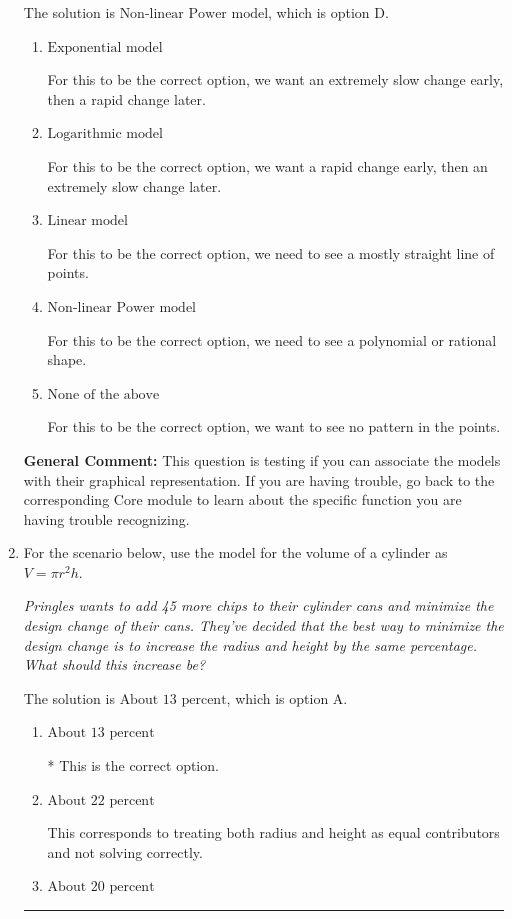\documentclass{extbook}[14pt]
\newcommand{\litem}[1]{\item #1

\rule{\textwidth}{0.4pt}}
\begin{document}
\begin{enumerate}
{The solution is \( \text{Non-linear Power model} \), which is option D.\begin{enumerate}[label=\Alph*.]
\item \( \text{Exponential model} \)

For this to be the correct option, we want an extremely slow change early, then a rapid change later.
\item \( \text{Logarithmic model} \)

For this to be the correct option, we want a rapid change early, then an extremely slow change later.
\item \( \text{Linear model} \)

For this to be the correct option, we need to see a mostly straight line of points.
\item \( \text{Non-linear Power model} \)

For this to be the correct option, we need to see a polynomial or rational shape.
\item \( \text{None of the above} \)

For this to be the correct option, we want to see no pattern in the points.
\end{enumerate}

\textbf{General Comment:} This question is testing if you can associate the models with their graphical representation. If you are having trouble, go back to the corresponding Core module to learn about the specific function you are having trouble recognizing.
}
\litem{
For the scenario below, use the model for the volume of a cylinder as $V = \pi r^2 h$.

\begin{center}
    \textit{ Pringles wants to add 45 \text{percent} more chips to their cylinder cans and minimize the design change of their cans. They've decided that the best way to minimize the design change is to increase the radius and height by the same percentage. What should this increase be? }
\end{center}
The solution is \( \text{About } 13 \text{ percent} \), which is option A.\begin{enumerate}[label=\Alph*.]
\item \( \text{About } 13 \text{ percent} \)

* This is the correct option.
\item \( \text{About } 22 \text{ percent} \)

This corresponds to treating both radius and height as equal contributors and not solving correctly.
\item \( \text{About } 20 \text{ percent} \)


\end{enumerate}}
\end{enumerate}
\end{document}
